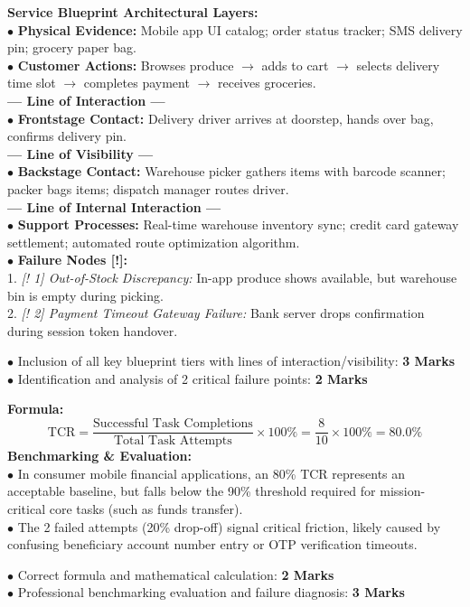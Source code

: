 \begin{solutionbox}
\textbf{Service Blueprint Architectural Layers:}\\
$\bullet$ \textbf{Physical Evidence:} Mobile app UI catalog; order status tracker; SMS delivery pin; grocery paper bag.\\
$\bullet$ \textbf{Customer Actions:} Browses produce $\to$ adds to cart $\to$ selects delivery time slot $\to$ completes payment $\to$ receives groceries.\\
\textbf{--- Line of Interaction ---}\\
$\bullet$ \textbf{Frontstage Contact:} Delivery driver arrives at doorstep, hands over bag, confirms delivery pin.\\
\textbf{--- Line of Visibility ---}\\
$\bullet$ \textbf{Backstage Contact:} Warehouse picker gathers items with barcode scanner; packer bags items; dispatch manager routes driver.\\
\textbf{--- Line of Internal Interaction ---}\\
$\bullet$ \textbf{Support Processes:} Real-time warehouse inventory sync; credit card gateway settlement; automated route optimization algorithm.\\
$\bullet$ \textbf{Failure Nodes [!]:}\\
1. \textit{[! 1] Out-of-Stock Discrepancy:} In-app produce shows available, but warehouse bin is empty during picking.\\
2. \textit{[! 2] Payment Timeout Gateway Failure:} Bank server drops confirmation during session token handover.
\begin{markingrubric}
$\bullet$ Inclusion of all key blueprint tiers with lines of interaction/visibility: \textbf{3 Marks}\\
$\bullet$ Identification and analysis of 2 critical failure points: \textbf{2 Marks}
\end{markingrubric}
\end{solutionbox}

\begin{solutionbox}
\textbf{Formula:}
\[
\text{TCR} = \frac{\text{Successful Task Completions}}{\text{Total Task Attempts}} \times 100\% = \frac{8}{10} \times 100\% = \mathbf{80.0\%}
\]
\textbf{Benchmarking \& Evaluation:}\\
$\bullet$ In consumer mobile financial applications, an 80\% TCR represents an acceptable baseline, but falls below the 90\% threshold required for mission-critical core tasks (such as funds transfer).\\
$\bullet$ The 2 failed attempts (20\% drop-off) signal critical friction, likely caused by confusing beneficiary account number entry or OTP verification timeouts.
\begin{markingrubric}
$\bullet$ Correct formula and mathematical calculation: \textbf{2 Marks}\\
$\bullet$ Professional benchmarking evaluation and failure diagnosis: \textbf{3 Marks}
\end{markingrubric}
\end{solutionbox}

